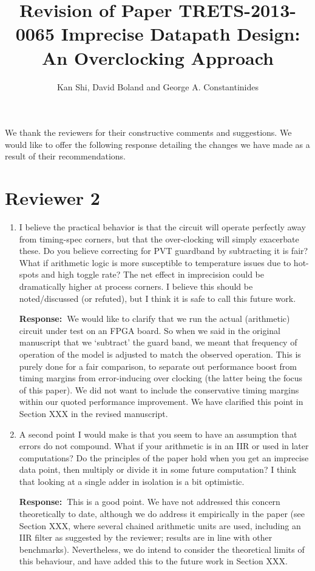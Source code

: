 \documentclass[a4paper, 11pt]{article}
\title{Revision of Paper TRETS-2013-0065 Imprecise Datapath Design: An Overclocking Approach}
\author{Kan Shi, David Boland and George A. Constantinides}
\date{}
\def\Response{\noindent \textbf{Response:~}}
\newcommand{\Question}[1]{\textcolor[rgb]{0.51,0.00,0.00}{#1}}
\begin{document}
\maketitle

We thank the reviewers for their constructive comments and suggestions. We would like to offer the following response detailing the changes we have made as a result of their recommendations.

\section*{Reviewer 2}
\begin{enumerate}
  \item \Question{I believe the practical behavior is that the circuit will operate perfectly away from timing-spec corners, but that the over-clocking will simply exacerbate these. Do you believe correcting for PVT guardband by subtracting it is fair? What if arithmetic logic is more susceptible to temperature issues due to hot-spots and high toggle rate? The net effect in imprecision could be dramatically higher at process corners. I believe this should be noted/discussed (or refuted), but I think it is safe to call this future work.}
      
      \Response We would like to clarify that we run the actual (arithmetic) circuit under test on an FPGA board. So when we said in the original manuscript that we `subtract' the guard band, we meant that frequency of operation of the model is adjusted to match the observed operation. This is purely done for a fair comparison, to separate out performance boost from timing margins from error-inducing over clocking (the latter being the focus of this paper). We did not want to include the conservative timing margins within our quoted performance improvement. We have clarified this point in Section XXX in the revised manuscript.
      
  \item \Question{A second point I would make is that you seem to have an assumption that errors do not compound. What if your arithmetic is in an IIR or used in later computations? Do the principles of the paper hold when you get an imprecise data point, then multiply or divide it in some future computation?  I think that looking at a single adder in isolation is a bit optimistic.}
      
      \Response This is a good point. We have not addressed this concern theoretically to date, although we do address it empirically in the paper (see Section XXX, where several chained arithmetic units are used, including an IIR filter as suggested by the reviewer; results are in line with other benchmarks). Nevertheless, we do intend to consider the theoretical limits of this behaviour, and have added this to the future work in Section XXX. 
            

\end{enumerate}
\end{document}
